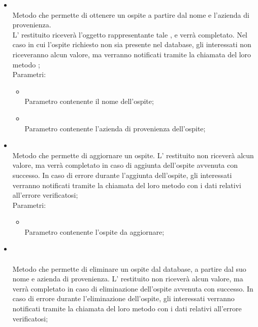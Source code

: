 \begin{itemize}
\begin{itemize}
\begin{itemize}
		\end{itemize}
		\item[]  \\		Metodo che permette di ottenere un ospite a partire dal nome e l'azienda di provenienza. \\
L' restituito riceverà l'oggetto rappresentante tale , e verrà completato. Nel caso in cui l'ospite richiesto non sia presente nel database, gli  interessati non riceveranno alcun valore, ma verranno notificati tramite la chiamata del loro metodo ;\\
		Parametri:
		\begin{itemize}
			\item {} \\
			Parametro contenente il nome dell'ospite;
			\item {} \\
			Parametro contenente l'azienda di provenienza dell'ospite;
		\end{itemize}
		\item[]  \\		Metodo che permette di aggiornare un ospite.  L' restituito non riceverà alcun valore, ma verrà completato in caso di aggiunta dell'ospite avvenuta con successo. In caso di errore durante l'aggiunta dell'ospite, gli  interessati verranno notificati tramite la chiamata del loro metodo  con i dati relativi all'errore verificatosi;\\
		Parametri:
		\begin{itemize}
			\item {} \\
			Parametro contenente l'ospite da aggiornare;
		\end{itemize}
		\item[]  \\\\		Metodo che permette di eliminare un ospite dal database, a partire dal suo nome e azienda di provenienza.  L' restituito non riceverà alcun valore, ma verrà completato in caso di eliminazione  dell'ospite avvenuta con successo. In caso di errore durante l'eliminazione dell'ospite, gli  interessati verranno notificati tramite la chiamata del loro metodo  con i dati relativi all'errore verificatosi;\\

\end{itemize}
\end{itemize}
